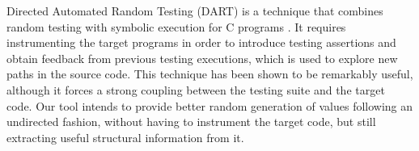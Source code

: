 %
%
Directed Automated Random Testing (DART) is a technique that combines random
testing with symbolic execution for C programs \cite{godefroid2005dart}.
%
It requires instrumenting the target programs in order to introduce testing
assertions and obtain feedback from previous testing executions, which is used
to explore new paths in the source code.
%
This technique has been shown to be remarkably useful, although it forces a
strong coupling between the testing suite and the target code.
%
Our tool intends to provide better random generation of values following an
undirected fashion, without having to instrument the target code, but still
extracting useful structural information from it.
